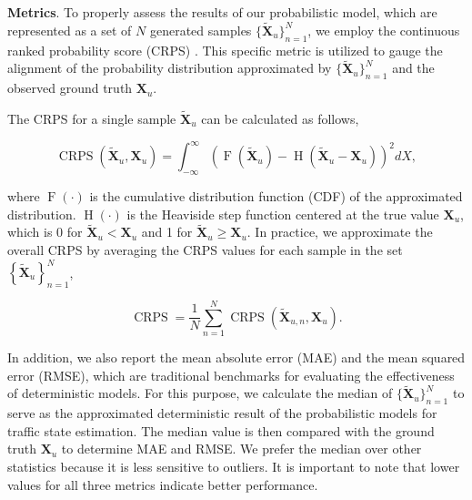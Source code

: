 \documentclass[a4paper,fleqn,12pt]{cas-sc}
\newcommand{\rev}[1]{{\color{red} #1}}
\begin{document}
\noindent\textbf{Metrics}. To properly assess the results of our probabilistic model, which are represented as a set of $N$ generated samples $\{\widetilde{\boldsymbol{X}}_{u}\}_{n=1}^{N}$, we employ the continuous ranked probability score (CRPS) \citep{matheson1976scoring,zamo2018estimation}. This specific metric is utilized to gauge the alignment of the probability distribution approximated by $\{\widetilde{\boldsymbol{X}}_{u}\}_{n=1}^{N}$ and the observed ground truth $\boldsymbol{X}_{u}$. \rev{The CRPS for a single sample $\widetilde{\mathbf{X}}_u$ can be calculated as follows,
\begin{linenomath*}
\begin{equation}
\operatorname{CRPS}\left(\widetilde{\mathbf{X}}_u, \mathbf{X}_u\right)=\int_{-\infty}^{\infty}(\operatorname{F}(\widetilde{\mathbf{X}}_u)-\operatorname{H}(\widetilde{\mathbf{X}}_u - \mathbf{X}_u))^2 {dX},
\end{equation}
\end{linenomath*}
where $\operatorname{F}(\cdot)$ is the cumulative distribution function (CDF) of the approximated distribution. $\operatorname{H}(\cdot)$ is the Heaviside step function centered at the true value $\mathbf{X}_u$, which is 0 for $\widetilde{\mathbf{X}}_u < \mathbf{X}_u$ and 1 for $\widetilde{\mathbf{X}}_u \geq \mathbf{X}_u$. In practice, we approximate the overall CRPS by averaging the CRPS values for each sample in the set $\left\{\widetilde{\mathbf{X}}_u\right\}_{n=1}^{N}$,
\begin{linenomath*}
\begin{equation}
\operatorname{CRPS}=\frac{1}{N} \sum_{n=1}^{N} \operatorname{CRPS}\left(\widetilde{\mathbf{X}}_{u, n}, \mathbf{X}_u\right).
\end{equation}
\end{linenomath*}
}

In addition, we also report the mean absolute error (MAE) and the mean squared error (RMSE), which are traditional benchmarks for evaluating the effectiveness of deterministic models. For this purpose, we calculate the median of $\{\widetilde{\boldsymbol{X}}_{u}\}_{n=1}^{N}$ to serve as the approximated deterministic result of the probabilistic models for traffic state estimation. \rev{The median value is then compared with the ground truth $\boldsymbol{X}_{u}$ to determine MAE and RMSE. We prefer the median over other statistics because it is less sensitive to outliers.} It is important to note that lower values for all three metrics indicate better performance.
\end{document}
